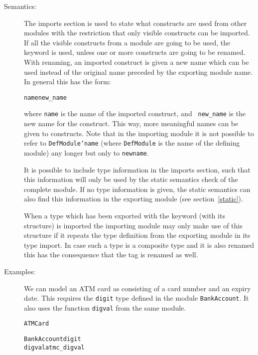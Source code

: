 \documentclass[\pformat,12pt]{article}
\begin{document}
\begin{description}
\item[Semantics:] The imports section is used to state what constructs are
  used from other modules with the restriction that only visible constructs
  can be imported. If all the visible constructs from a
  module are going to be used, the keyword  is used, unless one or
  more constructs are going to be renamed. With renaming, an imported
  construct is given a new name
  which can be used instead of the original name preceded by the
  exporting module name. In general this has the form:
  \begin{alltt}
    name  new_name
  \end{alltt}
  where {\tt name} is the name of the imported construct, and {\tt
    new\_name} is the new name for the construct. This way,
  more meaningful names can be given to constructs. Note that in the importing
  module it is not possible to refer to {\tt DefModule`name} (where
  {\tt DefModule} is the name of the defining module) any longer but only to
  {\tt newname}.

  It is possible to include type information in the imports section,
such that
  this information will only be used by the static semantics check of the
  complete module. If no type information is given, the static semantics
  can also find this information in the exporting module (see
  section~\ref{static}).
  
  When a type which has been exported with the  keyword
  (with its structure) is imported the
  importing module may only make use of this structure if it repeats
  the type definition from the exporting module in its type import. In
  case such a type is a composite type and it is also renamed this has
  the consequence that the tag is renamed as well.
  
\item[Examples:] We can model an ATM card as consisting of a
card number and an expiry date. This requires the \texttt{digit} type
defined in the module \texttt{BankAccount}. It also uses the function
\texttt{digval} from the same module.
\begin{alltt}
 ATMCard

     BankAccount  digit 
                      digval  atmc_digval





\end{alltt}
\end{description}
\end{document}
